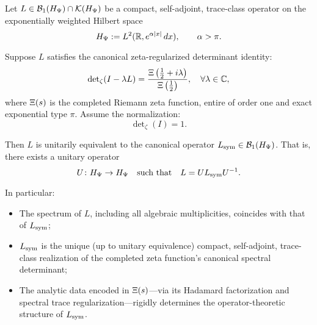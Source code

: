 \begin{theorem}
\label{thm:uniqueness_realization}

Let \( L \in \mathcal{B}_1(H_{\Psi}) \cap \mathcal{K}(H_{\Psi}) \) be a compact, self-adjoint, trace-class operator on the exponentially weighted Hilbert space
\[
H_{\Psi} := L^2(\mathbb{R}, e^{\alpha |x|} \, dx), \qquad \alpha > \pi.
\]

Suppose \( L \) satisfies the canonical zeta-regularized determinant identity:
\[
\det\nolimits_\zeta(I - \lambda L) = \frac{\Xi\left( \tfrac{1}{2} + i\lambda \right)}{\Xi\left( \tfrac{1}{2} \right)},
\quad \forall \lambda \in \mathbb{C},
\]
where \( \Xi(s) \) is the completed Riemann zeta function, entire of order one and exact exponential type \( \pi \). Assume the normalization:
\[
\det\nolimits_\zeta(I) = 1.
\]

Then \( L \) is unitarily equivalent to the canonical operator \( L_{\mathrm{sym}} \in \mathcal{B}_1(H_{\Psi}) \). That is, there exists a unitary operator
\[
U \colon H_{\Psi} \to H_{\Psi} \quad \text{such that} \quad L = U L_{\mathrm{sym}} U^{-1}.
\]

\medskip
\noindent
In particular:
\begin{itemize}
  \item The spectrum of \( L \), including all algebraic multiplicities, coincides with that of \( L_{\mathrm{sym}} \);
  \item \( L_{\mathrm{sym}} \) is the unique (up to unitary equivalence) compact, self-adjoint, trace-class realization of the completed zeta function’s canonical spectral determinant;
  \item The analytic data encoded in \( \Xi(s) \)—via its Hadamard factorization and spectral trace regularization—rigidly determines the operator-theoretic structure of \( L_{\mathrm{sym}} \).
\end{itemize}
\end{theorem}

